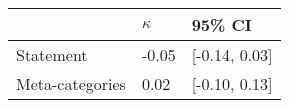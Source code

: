 \begin{tabular}{lll}
\hline
 & $\kappa$ & 95\% CI  \\
\hline
Statement & -0.05 & [-0.14, 0.03] \\
Meta-categories & 0.02 & [-0.10, 0.13] \\
\hline
\end{tabular}
